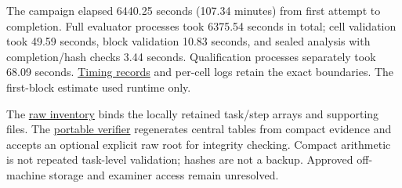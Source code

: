 \documentclass[11pt,a4paper]{article}
\begin{document}
The campaign elapsed 6440.25 seconds (107.34 minutes) from first attempt to completion. Full evaluator processes took 6375.54 seconds in total; cell validation took 49.59 seconds, block validation 10.83 seconds, and sealed analysis with completion/hash checks 3.44 seconds. Qualification processes separately took 68.09 seconds. \href{\detokenize{evidence/TIMING.json}}{Timing records} and per-cell logs retain the exact boundaries. The first-block estimate used runtime only.

The \href{\detokenize{evidence/RAW_INVENTORY.json}}{raw inventory} binds the locally retained task/step arrays and supporting files. The \href{\detokenize{document/verify_results.py}}{portable verifier} regenerates central tables from compact evidence and accepts an optional explicit raw root for integrity checking. Compact arithmetic is not repeated task-level validation; hashes are not a backup. Approved off-machine storage and examiner access remain unresolved.
\end{document}
